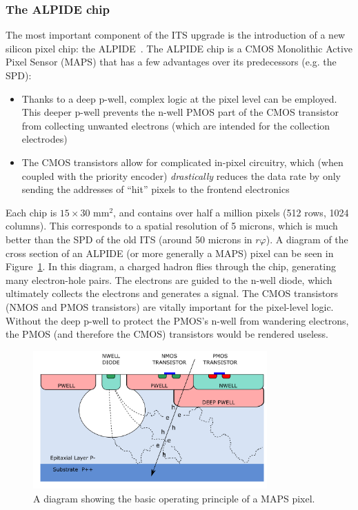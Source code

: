 \subsubsection{The ALPIDE chip}
The most important component of the ITS upgrade is the introduction of a new silicon pixel chip: the ALPIDE~\cite{ALPIDE}. The ALPIDE chip is a CMOS Monolithic Active Pixel Sensor (MAPS) that has a few advantages over its predecessors (e.g. the SPD):
\begin{itemize}
    \item Thanks to a deep p-well, complex logic at the pixel level can be employed. This deeper p-well prevents the n-well PMOS part of the CMOS transistor from collecting unwanted electrons (which are intended for the collection electrodes)
    \item The CMOS transistors allow for complicated in-pixel circuitry, which (when coupled with the priority encoder) \textit{drastically} reduces the data rate by only sending the addresses of ``hit'' pixels to the frontend electronics
\end{itemize}
Each chip is $15\times30$ mm$^2$, and contains over half a million pixels (512 rows, 1024 columns). This corresponds to a spatial resolution of 5 microns, which is much better than the SPD of the old ITS (around 50 microns in $r\varphi$). A diagram of the cross section of an ALPIDE (or more generally a MAPS) pixel can be seen in Figure~\ref{fig:alpide_diagram}. In this diagram, a charged hadron flies through the chip, generating many electron-hole pairs. The electrons are guided to the n-well diode, which ultimately collects the electrons and generates a signal. The CMOS transistors (NMOS and PMOS transistors) are vitally important for the pixel-level logic. Without the deep p-well to protect the PMOS's n-well from wandering electrons, the PMOS (and therefore the CMOS) transistors would be rendered useless.

\begin{figure}
    \centering
    \includegraphics[width=0.8\textwidth]{figures/experiment/alpide_cross.png}
    \caption{A diagram showing the basic operating principle of a MAPS pixel.}
    \label{fig:alpide_diagram}
\end{figure}

